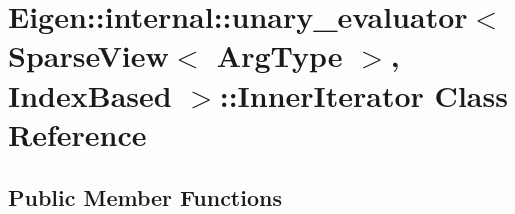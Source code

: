 \hypertarget{class_eigen_1_1internal_1_1unary__evaluator_3_01_sparse_view_3_01_arg_type_01_4_00_01_index_based_01_4_1_1_inner_iterator}{}\section{Eigen\+::internal\+::unary\+\_\+evaluator$<$ Sparse\+View$<$ Arg\+Type $>$, Index\+Based $>$\+::Inner\+Iterator Class Reference}
\label{class_eigen_1_1internal_1_1unary__evaluator_3_01_sparse_view_3_01_arg_type_01_4_00_01_index_based_01_4_1_1_inner_iterator}
\subsection*{Public Member Functions}
